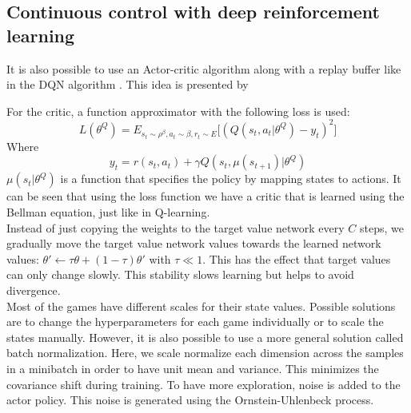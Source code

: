 \documentclass[a4paper, 11pt]{article}
\begin{document}
\subsection{Continuous control with deep reinforcement learning}
It is also possible to use an Actor-critic algorithm along with a replay buffer like in the DQN algorithm \citep{Mnih2015Human-levelLearning}. This idea is presented by \cite{Lillicrap2015ContinuousLearning}

For the critic, a function approximator with the following loss is used:
\begin{equation}
L(\theta^Q) = E_{s_t \sim \rho^{\beta}, a_t \sim \beta, r_t \sim E} \big [ (Q(s_t, a_t \vert \theta^Q) - y_t)^2 \big ]
\end{equation}
Where
\begin{equation}
y_t = r(s_t,a_t) + \gamma Q(s_t, \mu(s_{t+1}) \vert \theta^Q)
\end{equation}
$\mu(s_t \vert \theta^Q)$ is a function that specifies the policy by mapping states to actions.
It can be seen that using the loss function we have a critic that is learned using the Bellman equation, just like in Q-learning.\\

Instead of just copying the weights to the target value network every $C$ steps, we gradually move the target value network values towards the learned network values: $\theta' \leftarrow \tau \theta + (1-\tau) \theta'$ with $\tau \ll 1$. This has the effect that target values can only change slowly. This stability slows learning but helps to avoid divergence.\\

Most of the games have different scales for their state values. Possible solutions are to change the hyperparameters for each game individually or to scale the states manually. However, it is also possible to use a more general solution called batch normalization. Here, we scale normalize each dimension across the samples in a minibatch in order to have unit mean and variance. This minimizes the covariance shift during training.
To have more exploration, noise is added to the actor policy. This noise is generated using the Ornstein-Uhlenbeck process.
\end{document}
